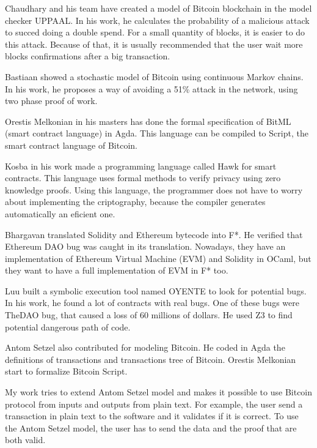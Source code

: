 \documentclass[12pt]{article}
\begin{document}
Chaudhary \cite{chaudhary2015modeling} and his team have created a model of Bitcoin blockchain
in the model checker UPPAAL.
In his work, he calculates the probability of a malicious attack to succed doing a double spend.
For a small quantity of blocks, it is easier to do this attack.
Because of that, it is usually recommended that the user wait more blocks confirmations
after a big transaction.

Bastiaan \cite{bastiaan2015preventing} showed a stochastic model of Bitcoin using
continuous Markov chains.
In his work, he proposes a way of avoiding a 51\% attack in the network,
using two phase proof of work.

Orestis Melkonian \cite{melkonian2019formalizing} in his masters has done the formal specification
of BitML (smart contract language) in Agda.
This language can be compiled to Script, the smart contract language of Bitcoin. 

Kosba \cite{kosba2016hawk} in his work made a programming language called Hawk for smart contracts.
This language uses formal methods to verify privacy using zero knowledge proofs.
Using this language, the programmer does not have to worry about implementing the criptography,
because the compiler generates automatically an eficient one.

Bhargavan \cite{bhargavan2016formal} translated Solidity and Ethereum bytecode into F*.
He verified that Ethereum DAO bug was caught in its translation.
Nowadays, they have an implementation of Ethereum Virtual Machine (EVM) and Solidity in OCaml,
but they want to have a full implementation of EVM in F* too.

Luu \cite{luu2016making} built a symbolic execution tool named OYENTE to look for potential bugs.
In his work, he found a lot of contracts with real bugs.
One of these bugs were TheDAO bug, that caused a loss of 60 millions of dollars.
He used Z3
to find potential dangerous path of code.

Antom Setzel \cite{setzer2018modelling} also contributed for modeling Bitcoin.
He coded in Agda the definitions of transactions and
transactions tree of Bitcoin.
Orestis Melkonian start to formalize Bitcoin Script.

My work tries to extend Antom Setzel model and makes it possible to use Bitcoin protocol
from inputs and outputs from plain text.
For example, the user send a transaction in plain text to the software and it validates if it is correct.
To use the Antom Setzel model, the user has to send the data and the proof that are both valid.
\end{document}
